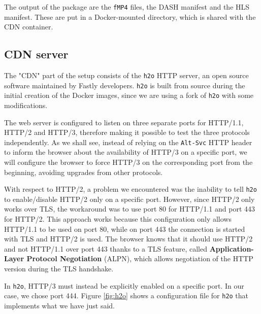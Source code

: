 The output of the package are the \texttt{fMP4} files, the DASH manifest and the HLS manifest. These are put in a Docker-mounted directory, which is shared with the CDN container.

\subsection{CDN server}
\label{sec:eval/testbed/cdn}

The "CDN" part of the setup consists of the \texttt{h2o} HTTP server, an open source software maintained by Fastly developers. \texttt{h2o} is built from source during the initial creation of the Docker images, since we are using a fork of \texttt{h2o} with some modifications.

The web server is configured to listen on three separate ports for HTTP/1.1, HTTP/2 and HTTP/3, therefore making it possible to test the three protocols independently. As we shall see, instead of relying on the \texttt{Alt-Svc} HTTP header to inform the browser about the availability of HTTP/3 on a specific port, we will configure the browser to force HTTP/3 on the corresponding port from the beginning, avoiding upgrades from other protocols.

With respect to HTTP/2, a problem we encountered was the inability to tell \texttt{h2o} to enable/disable HTTP/2 only on a specific port. However, since HTTP/2 only works over TLS, the workaround was to use port 80 for HTTP/1.1 and port 443 for HTTP/2. This approach works because this configuration only allows HTTP/1.1 to be used on port 80, while on port 443 the connection is started with TLS and HTTP/2 is used. The browser knows that it should use HTTP/2 and not HTTP/1.1 over port 443 thanks to a TLS feature, called \textbf{Application-Layer Protocol Negotiation} (ALPN), which allows negotiation of the HTTP version during the TLS handshake.

In \texttt{h2o}, HTTP/3 must instead be explicitly enabled on a specific port. In our case, we chose port 444. Figure \ref{fig:h2o} shows a configuration file for \texttt{h2o} that implements what we have just said.

